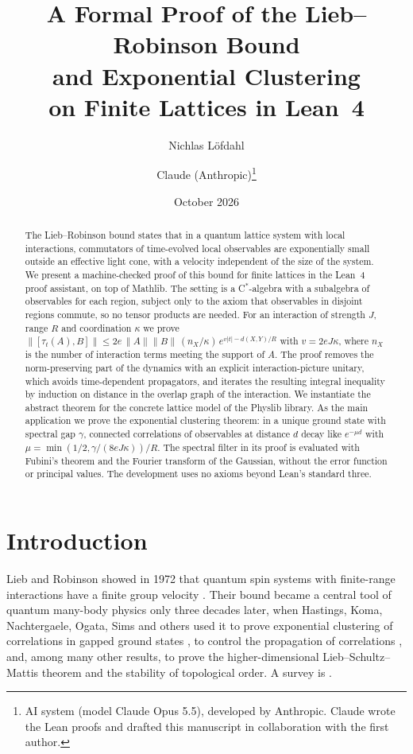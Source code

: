 \documentclass[11pt]{article}
\title{A Formal Proof of the Lieb--Robinson Bound\\ and Exponential Clustering\\ on Finite Lattices in Lean~4}
\author{Nichlas Löfdahl \and Claude (Anthropic)\thanks{AI system (model Claude Opus 5.5), developed by Anthropic.
Claude wrote the Lean proofs and drafted this manuscript in collaboration with the first author.}}
\date{October 2026}
\theoremstyle{definition}
\theoremstyle{remark}
\newcommand{\norm}[1]{\|#1\|}
\begin{document}
\sloppy
\maketitle

\begin{abstract}
The Lieb--Robinson bound states that in a quantum lattice system with local interactions,
commutators of time-evolved local observables are exponentially small outside an effective light
cone, with a velocity independent of the size of the system. We present a machine-checked proof
of this bound for finite lattices in the Lean~4 proof assistant, on top of Mathlib. The setting
is a C$^*$-algebra with a subalgebra of observables for each region, subject only to the axiom that
observables in disjoint regions commute, so no tensor products are needed. For an interaction of
strength $J$, range $R$ and coordination $\kappa$ we prove
$\norm{[\tau_t(A),B]}\le 2e\,\norm{A}\norm{B}\,(n_X/\kappa)\,e^{v|t|-d(X,Y)/R}$ with $v=2eJ\kappa$,
where $n_X$ is the number of interaction terms meeting the support of $A$. The proof removes the
norm-preserving part of the dynamics with an explicit interaction-picture unitary, which avoids
time-dependent propagators, and iterates the resulting integral inequality by induction on
distance in the overlap graph of the interaction. We instantiate the abstract theorem for the
concrete lattice model of the Physlib library. As the main application we prove the exponential
clustering theorem: in a unique ground state with spectral gap $\gamma$, connected correlations
of observables at distance $d$ decay like $e^{-\mu d}$ with
$\mu=\min(1/2,\gamma/(8eJ\kappa))/R$. The spectral filter in its proof is evaluated with Fubini's
theorem and the Fourier transform of the Gaussian, without the error function or principal
values. The development uses no axioms beyond Lean's standard three.
\end{abstract}

\section{Introduction}

Lieb and Robinson showed in 1972 that quantum spin systems with finite-range interactions have a
finite group velocity \cite{liebrobinson1972}. Their bound became a central tool of quantum
many-body physics only three decades later, when Hastings, Koma, Nachtergaele, Ogata, Sims and
others used it to prove exponential clustering of correlations in gapped ground states
\cite{nachtergaelesims2006,hastingskoma2006}, to control the propagation of correlations
\cite{nachtergaeleogatasims2006}, and, among many other results, to prove the higher-dimensional
Lieb--Schultz--Mattis theorem and the stability of topological order. A survey is
\cite{nachtergaelesims2010}.
\end{document}
